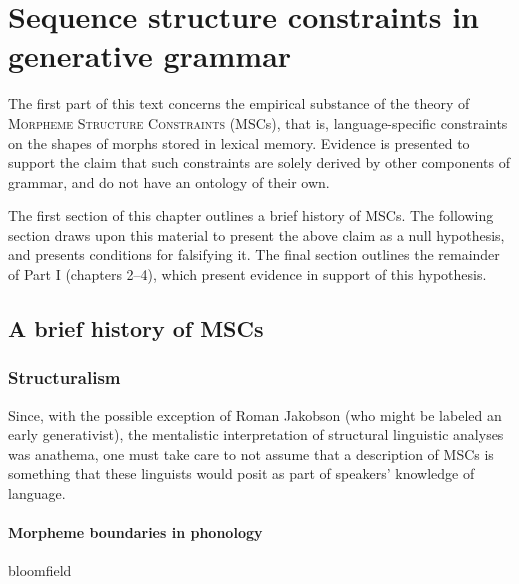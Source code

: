 \chapter{Sequence structure constraints in generative grammar} \label{msc}

The first part of this text concerns the empirical substance of the theory of \textsc{Morpheme Structure Constraints} (MSCs), that is, language-specific constraints on the shapes of morphs stored in lexical memory.
Evidence is presented to support the claim that such constraints are solely derived by other components of grammar, and do not have an ontology of their own.

The first section of this chapter outlines a brief history of MSCs.
The following section draws upon this material to present the above claim as a null hypothesis, and presents conditions for falsifying it.
The final section outlines the remainder of Part I (chapters 2--4), which present evidence in support of this hypothesis.


\section{A brief history of MSCs}

\subsection{Structuralism}

Since, with the possible exception of Roman Jakobson (who might be labeled an early generativist), the mentalistic interpretation of structural linguistic analyses was anathema, one must take care to not assume that a description of MSCs is something that these linguists would posit as part of speakers' knowledge of language.

\subsubsection{Morpheme boundaries in phonology}

bloomfield


